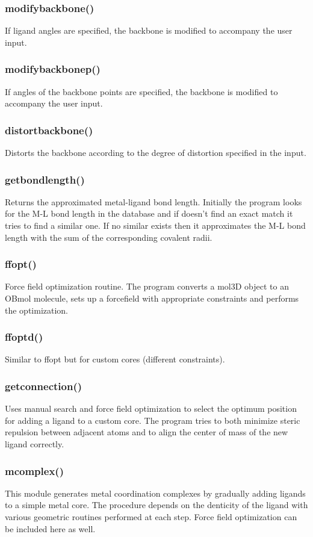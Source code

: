 \documentclass[a4paper,12pt]{assignment}
\begin{document}
\subsubsection{modifybackbone()}
If ligand angles are specified, the backbone is modified to accompany the user input.
\subsubsection{modifybackbonep()}
If angles of the backbone points are specified, the backbone is modified to accompany the user input.
\subsubsection{distortbackbone()}
Distorts the backbone according to the degree of distortion specified in the input.
\subsubsection{getbondlength()}
Returns the approximated metal-ligand bond length. Initially the program looks for the M-L bond length in the database and if doesn't find an exact match it tries to find a similar one. If no similar exists then it approximates the M-L bond length with the sum of the corresponding covalent radii.
\subsubsection{ffopt()}
Force field optimization routine. The program converts a mol3D object to an OBmol molecule, sets up a forcefield with appropriate constraints and performs the optimization.
\subsubsection{ffoptd()}
Similar to ffopt but for custom cores (different constraints).
\subsubsection{getconnection()}
Uses manual search and force field optimization to select the optimum position for adding a ligand to a custom core. The program tries to both minimize steric repulsion between adjacent atoms and to align the center of mass of the new ligand correctly.
\subsubsection{mcomplex()}
This module generates metal coordination complexes by gradually adding ligands to a simple metal core. The procedure depends on the denticity of the ligand with various geometric routines performed at each step. Force field optimization can be included here as well.
\end{document}
